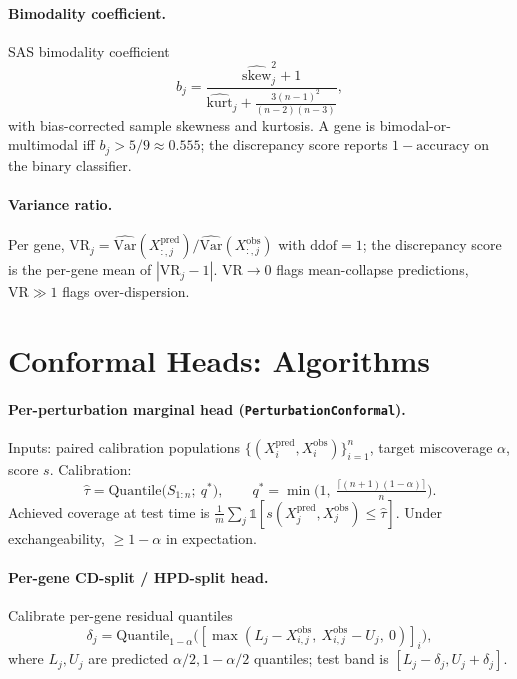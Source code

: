 \documentclass{article}
\begin{document}
\paragraph{Bimodality coefficient.} SAS bimodality coefficient
\begin{equation*}
b_j = \frac{\widehat{\mathrm{skew}}_j^2 + 1}{\widehat{\mathrm{kurt}}_j + \frac{3(n-1)^2}{(n-2)(n-3)}},
\end{equation*}
with bias-corrected sample skewness and kurtosis. A gene is bimodal-or-multimodal iff $b_j > 5/9 \approx 0.555$; the discrepancy score reports $1 - \mathrm{accuracy}$ on the binary classifier.

\paragraph{Variance ratio.} Per gene, $\mathrm{VR}_j = \widehat{\mathrm{Var}}(X^{\text{pred}}_{:, j}) / \widehat{\mathrm{Var}}(X^{\text{obs}}_{:, j})$ with $\mathrm{ddof}=1$; the discrepancy score is the per-gene mean of $|\mathrm{VR}_j - 1|$. $\mathrm{VR} \to 0$ flags mean-collapse predictions, $\mathrm{VR} \gg 1$ flags over-dispersion.

\section{Conformal Heads: Algorithms}
\label{app:conformal}

\paragraph{Per-perturbation marginal head (\texttt{PerturbationConformal}).} Inputs: paired calibration populations $\{(X^{\text{pred}}_i, X^{\text{obs}}_i)\}_{i=1}^{n}$, target miscoverage $\alpha$, score $s$. Calibration:
\begin{equation*}
\hat{\tau} = \mathrm{Quantile}\bigl(S_{1:n};\ q^*\bigr), \qquad q^* = \min\bigl(1,\ \tfrac{\lceil (n+1)(1-\alpha)\rceil}{n}\bigr).
\end{equation*}
Achieved coverage at test time is $\frac{1}{m}\sum_j \mathbb{1}[s(X^{\text{pred}}_j, X^{\text{obs}}_j) \leq \hat{\tau}]$. Under exchangeability, $\geq 1 - \alpha$ in expectation.

\paragraph{Per-gene CD-split / HPD-split head.} Calibrate per-gene residual quantiles
\begin{equation*}
\delta_j = \mathrm{Quantile}_{1-\alpha}\!\bigl([\max(L_j - X^{\text{obs}}_{i,j},\ X^{\text{obs}}_{i,j} - U_j,\ 0)]_i\bigr),
\end{equation*}
where $L_j, U_j$ are predicted $\alpha/2, 1-\alpha/2$ quantiles; test band is $[L_j - \delta_j, U_j + \delta_j]$.
\end{document}

